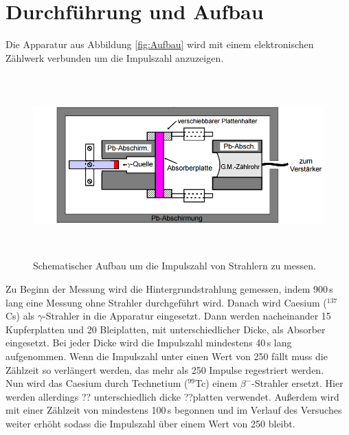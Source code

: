 \newpage
\section{Durchführung und Aufbau}
\label{sec:Durchführung}
Die Apparatur aus Abbildung \eqref{fig:Aufbau} wird mit einem elektronischen Zählwerk verbunden um die Impulszahl anzuzeigen. \\

\begin{figure}[H]
  \centering
  \includegraphics[height=7cm]{picture/Aufbau.PNG}
  \caption{Schematischer Aufbau um die Impulszahl von Strahlern zu messen. \cite[14]{sample}}
  \label{fig:Aufbau}
\end{figure}

Zu Beginn der Messung wird die Hintergrundstrahlung gemessen, indem 900\,s lang eine Messung ohne Strahler durchgeführt wird. Danach wird Caesium ($^{137}$Cs) als $\gamma$-Strahler in die Apparatur eingesetzt. Dann werden nacheinander 15 Kupferplatten und 20 Bleiplatten, mit unterschiedlicher Dicke, als Absorber eingesetzt. Bei jeder Dicke wird die Impulszahl mindestens 40\,s lang aufgenommen. Wenn die Impulszahl unter einen Wert von 250 fällt muss die Zählzeit so verlängert werden, das mehr als 250 Impulse regestriert werden. \\
Nun wird das Caesium durch Technetium ($^{99}$Tc) einem $\beta^-$-Strahler ersetzt. Hier werden allerdings ?? unterschiedlich dicke ??platten verwendet. Außerdem wird mit einer Zählzeit von mindestens 100\,s begonnen und im Verlauf des Versuches weiter erhöht sodass die Impulszahl über einem Wert von 250 bleibt.
